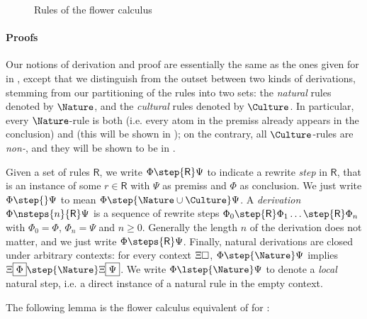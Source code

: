 \begin{figure*}[h!]
  
  \caption{Rules of the flower calculus}
\end{figure*}

\paragraph{Proofs}

Our notions of derivation and proof are essentially the same as the ones given
for  in , except that we distinguish from the outset between
two kinds of derivations, stemming from our partitioning of the rules into two
sets: the \emph{natural} rules denoted by $\Nature$, and the \emph{cultural}
rules denoted by $\Culture$. In particular, every $\Nature$-rule is both
\emph{} (i.e. every atom in the premiss already appears in the
conclusion) and \emph{} (this will be shown in ); on
the contrary, all $\Culture$-rules are \emph{non-}, and they will be
shown to be \emph{} in .

\begin{definition}[Derivation]
  Given a set of rules $\mathsf{R}$, we write $\Phi \step{\mathsf{R}} \Psi$ to
  indicate a rewrite \emph{step} in $\mathsf{R}$, that is an instance of some $r
  \in \mathsf{R}$ with $\Psi$ as premiss and $\Phi$ as conclusion. We just write
  $\Phi \step{} \Psi$ to mean $\Phi \step{\Nature\cup\Culture} \Psi$. A
  \emph{derivation} $\Phi \nsteps{n}{\mathsf{R}} \Psi$ is a sequence of rewrite
  steps $\Phi_0 \step{\mathsf{R}} \Phi_1 \ldots \step{\mathsf{R}} \Phi_n$ with
  $\Phi_0 = \Phi$, $\Phi_n = \Psi$ and $n \geq 0$. Generally the length $n$ of
  the derivation does not matter, and we just write $\Phi \steps{\mathsf{R}}
  \Psi$. Finally, natural derivations are closed under arbitrary contexts: for
  every context $\Xi\square$, $\Phi \step{\Nature} \Psi$ implies
  $\cfill{\Xi}{\Phi} \step{\Nature} \cfill{\Xi}{\Psi}$. We write $\Phi
  \lstep{\Nature} \Psi$ to denote a \emph{local} natural step, i.e. a direct
  instance of a natural rule in the empty context.
\end{definition}

The following lemma is the flower calculus equivalent of 
for :

